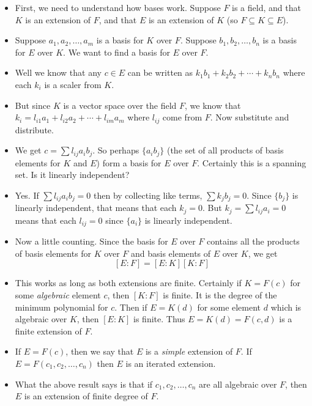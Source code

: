 \documentclass[12pt]{article}
\theoremstyle{plain}
\theoremstyle{definition}
\theoremstyle{remark}
\begin{document}
\begin{itemize}
\item First, we need to understand how bases work.  Suppose $F$ is a field, and that $K$ is an extension of $F$, and that $E$ is an extension of $K$ (so $F \subseteq K \subseteq E$).  
\item Suppose $a_1, a_2, \ldots, a_m$ is a basis for $K$ over $F$.  Suppose $b_1, b_2, \ldots, b_n$ is a basis for $E$ over $K$.  We want to find a basis for $E$ over $F$.
\item Well we know that any $c \in E$ can be written as $k_1b_1 + k_2b_2 + \cdots +k_nb_n$ where each $k_i$ is a scaler from $K$.
\item But since $K$ is a vector space over the field $F$, we know that $k_i = l_{i1}a_1 + l_{i2}a_2 + \cdots +l_{im}a_m$ where $l_{ij}$ come from $F$.  Now substitute and distribute.
\item We get $c = \sum l_{ij}a_ib_j$.  So perhaps $\{a_ib_j\}$ (the set of all products of basis elements for $K$ and $E$) form a basis for $E$ over $F$.  Certainly this is a spanning set.  Is it linearly independent?
\item Yes.  If $\sum l_{ij}a_ib_j = 0$ then by collecting like terms, $\sum k_jb_j = 0$.  Since $\{b_j\}$ is linearly independent, that means that each $k_j = 0$.  But $k_j = \sum l_{ij}a_i = 0$ means that each $l_{ij} = 0$ since $\{a_i\}$ is linearly independent.
\item Now a little counting.  Since the basis for $E$ over $F$ contains all the products of basis elements for $K$ over $F$ and basis elements of $E$ over $K$, we get
\[[E:F] = [E:K][K:F]\]
\item This works as long as both extensions are finite.  Certainly if $K = F(c)$ for some {\em algebraic} element $c$, then $[K:F]$ is finite.  It is the degree of the minimum polynomial for $c$.  Then if $E = K(d)$ for some element $d$ which is algebraic over $K$, then $[E:K]$ is finite.  Thus $E = K(d) = F(c,d)$ is a finite extension of $F$.
\item If $E = F(c)$, then we say that $E$ is a {\em simple} extension of $F$.  If $E = F(c_1, c_2, \ldots, c_n)$ then $E$ is an iterated extension.
\item What the above result says is that if $c_1, c_2, \ldots, c_n$ are all algebraic over $F$, then $E$ is an extension of finite degree of $F$.  

\end{itemize}
\end{document}
